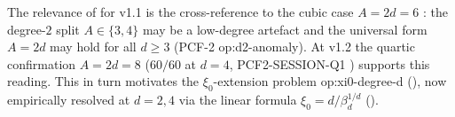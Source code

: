 The relevance of  for v1.1 is the
cross-reference to the cubic case
$A = 2d = 6$ \cite{siarc_pcf2_v11}: the degree-$2$ split
$A \in \{3, 4\}$ may be a low-degree artefact and the
universal form $A = 2d$ may hold for all $d \ge 3$ (PCF-2
\textsf{op:d2-anomaly}). At v1.2 the quartic confirmation
$A = 2d = 8$ ($60/60$ at $d=4$, PCF2-SESSION-Q1
\cite{siarc_pcf2_session_q1}) supports this reading. This in
turn motivates the $\xi_0$-extension problem
\textsf{op:xi0-degree-d} (), now empirically
resolved at $d=2,4$ via the linear formula
$\xi_0 = d / \beta_d^{1/d}$ ().
